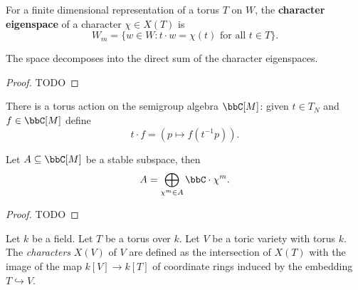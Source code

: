 \begin{definition}
  \label{1-1-char-eigenspace}

  For a finite dimensional representation of a torus $T$ on $W$, the {\bf character eigenspace} of a character $\chi \in X(T)$ is
  \[
    W_m = \{w\in W : t\cdot w = \chi(t)\text{ for all } t\in T \}.
  \]
\end{definition}


\begin{proposition}
  \label{1-1-2-char-eigenspace-direct-sum}

  The space decomposes into the direct sum of the character eigenspaces.
\end{proposition}
\begin{proof}
  \uses{}

  TODO
\end{proof}


\begin{definition}
  \label{1-1-tor-act-alg}

  There is a torus action on the semigroup algebra $\bbC[M]$: given $t\in T_N$ and $f\in \bbC[M]$ define
  \[
    t \cdot f = (p \mapsto f(t^{-1}p)).
  \]
\end{definition}


\begin{lemma}
  \label{1-1-16-total-red}
    Let $A \subseteq \bbC[M]$ be a stable subspace, then
    \[
      A = \bigoplus_{\chi^m \in A} \bbC \cdot \chi^m.
    \]
\end{lemma}
\begin{proof}

  TODO
\end{proof}


\begin{definition}
  \label{5-2-char-tor-var}
  \uses{}

  Let $k$ be a field.
  Let $T$ be a torus over $k$.
  Let $V$ be a toric variety with torus $k$.
  The \emph{characters} $X(V)$ of $V$ are defined as the intersection of $X(T)$
  with the image of the map $k[V] \to k[T]$ of coordinate rings
  induced by the embedding $T \hookrightarrow V$.
\end{definition}


